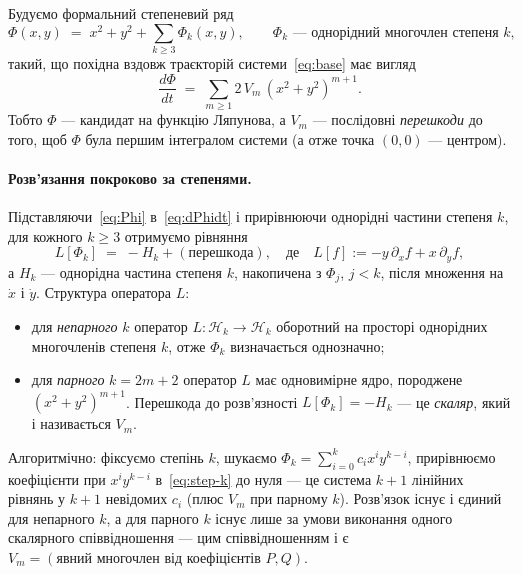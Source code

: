 \documentclass[12pt,a4paper]{article}
\begin{document}
Будуємо формальний степеневий ряд
\begin{equation}\label{eq:Phi}
\Phi(x,y) \;=\; x^{2}+y^{2}+\sum_{k\geq 3}\Phi_k(x,y),
\qquad \Phi_k\text{ --- однорідний многочлен степеня } k,
\end{equation}
такий, що похідна вздовж траєкторій системи~\eqref{eq:base} має вигляд
\begin{equation}\label{eq:dPhidt}
\frac{d\Phi}{dt}\;=\;\sum_{m\geq 1} 2\,V_m\,(x^{2}+y^{2})^{m+1}.
\end{equation}
Тобто $\Phi$ --- кандидат на функцію Ляпунова, а $V_m$ --- послідовні
\emph{перешкоди} до того, щоб $\Phi$ була першим інтегралом системи (а отже точка
$(0,0)$ --- центром).

\paragraph{Розв'язання покроково за степенями.}
Підставляючи~\eqref{eq:Phi} в~\eqref{eq:dPhidt} і прирівнюючи однорідні частини степеня $k$, для кожного $k\geq 3$
отримуємо рівняння
\begin{equation}\label{eq:step-k}
L[\Phi_k] \;=\; -H_k + \mathrm{(перешкода)},
\quad\text{де}\quad L[f] := -y\,\partial_x f + x\,\partial_y f,
\end{equation}
а $H_k$ --- однорідна частина степеня $k$, накопичена з $\Phi_j$, $j<k$, після множення
на $\dot x$ і $\dot y$.
Структура оператора $L$:
\begin{itemize}
    \item для \emph{непарного} $k$ оператор $L\colon\mathcal{H}_k\to\mathcal{H}_k$ оборотний на просторі однорідних многочленів степеня $k$, отже $\Phi_k$ визначається однозначно;
    \item для \emph{парного} $k=2m+2$ оператор $L$ має одновимірне ядро, породжене
          $(x^2+y^2)^{m+1}$. Перешкода до розв'язності $L[\Phi_k] = -H_k$ --- це
          \emph{скаляр}, який і називається $V_m$.
\end{itemize}

Алгоритмічно: фіксуємо степінь $k$, шукаємо $\Phi_k = \sum_{i=0}^{k} c_i x^i y^{k-i}$,
прирівнюємо коефіцієнти при $x^i y^{k-i}$ в~\eqref{eq:step-k} до нуля --- це система
$k+1$ лінійних рівнянь у $k+1$ невідомих $c_i$ (плюс $V_m$ при парному $k$). Розв'язок існує і єдиний для непарного $k$, а для парного $k$ існує лише за умови виконання одного скалярного співвідношення --- цим співвідношенням і є $V_m = (\text{явний многочлен від коефіцієнтів } P, Q)$.
\end{document}
